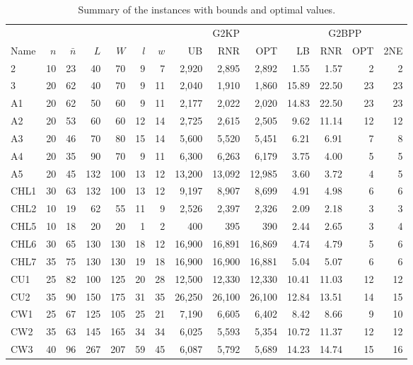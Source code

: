 \documentclass[9pt]{entcs}
\begin{document}
\begin{table}[ht]
\caption{Summary of the instances with bounds and optimal values.}
\begin{tabular}{@{\extracolsep{4pt}}lrrrrrrrrrrrrr@{}}
\hline\hline
& & & & & & & \multicolumn{3}{c}{G2KP} & \multicolumn{4}{c}{G2BPP} \\\cline{8-10}\cline{11-14}
Name & \(n\) & \(\bar{n}\) & \(L\) & \(W\) & \underline{\(l\)} & \underline{\(w\)} & UB & RNR & OPT & LB & RNR & OPT & 2NE\\\hline
2 & 10 & 23 & 40 & 70 & 9 & 7 & 2,920 & 2,895 & 2,892 & 1.55 & 1.57 & 2 & 2 \\
3 & 20 & 62 & 40 & 70 & 9 & 11 & 2,040 & 1,910 & 1,860 & 15.89 & 22.50 & 23 & 23 \\
A1 & 20 & 62 & 50 & 60 & 9 & 11 & 2,177 & 2,022 & 2,020 & 14.83 & 22.50 & 23 & 23 \\
A2 & 20 & 53 & 60 & 60 & 12 & 14 & 2,725 & 2,615 & 2,505 & 9.62 & 11.14 & 12 & 12 \\
A3 & 20 & 46 & 70 & 80 & 15 & 14 & 5,600 & 5,520 & 5,451 & 6.21 & 6.91 & 7 & 8 \\
A4 & 20 & 35 & 90 & 70 & 9 & 11 & 6,300 & 6,263 & 6,179 & 3.75 & 4.00 & 5 & 5 \\
A5 & 20 & 45 & 132 & 100 & 13 & 12 & 13,200 & 13,092 & 12,985 & 3.60 & 3.72 & 4 & 5 \\
CHL1 & 30 & 63 & 132 & 100 & 13 & 12 & 9,197 & 8,907 & 8,699 & 4.91 & 4.98 & 6 & 6 \\
CHL2 & 10 & 19 & 62 & 55 & 11 & 9 & 2,526 & 2,397 & 2,326 & 2.09 & 2.18 & 3 & 3 \\
CHL5 & 10 & 18 & 20 & 20 & 1 & 2 & 400 & 395 & 390 & 2.44 & 2.65 & 3 & 4 \\
CHL6 & 30 & 65 & 130 & 130 & 18 & 12 & 16,900 & 16,891 & 16,869 & 4.74 & 4.79 & 5 & 6 \\
CHL7 & 35 & 75 & 130 & 130 & 19 & 18 & 16,900 & 16,900 & 16,881 & 5.04 & 5.07 & 6 & 6 \\
CU1 & 25 & 82 & 100 & 125 & 20 & 28 & 12,500 & 12,330 & 12,330 & 10.41 & 11.03 & 12 & 12 \\
CU2 & 35 & 90 & 150 & 175 & 31 & 35 & 26,250 & 26,100 & 26,100 & 12.84 & 13.51 & 14 & 15 \\
CW1 & 25 & 67 & 125 & 105 & 25 & 21 & 7,190 & 6,605 & 6,402 & 8.42 & 8.66 & 9 & 10 \\
CW2 & 35 & 63 & 145 & 165 & 34 & 34 & 6,025 & 5,593 & 5,354 & 10.72 & 11.37 & 12 & 12 \\
CW3 & 40 & 96 & 267 & 207 & 59 & 45 & 6,087 & 5,792 & 5,689 & 14.23 & 14.74 & 15 & 16 \\

\end{tabular}
\end{table}
\end{document}
